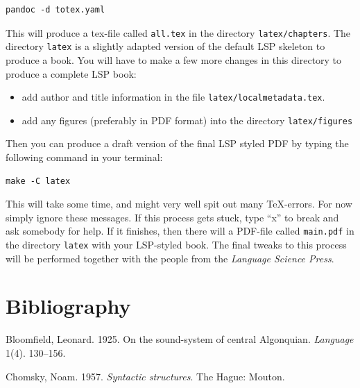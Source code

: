 \begin{verbatim}
pandoc -d totex.yaml
\end{verbatim}

This\paragraphnumber{[3.10]} will produce a tex-file called
\texttt{all.tex} in the directory \texttt{latex/chapters}. The directory
\texttt{latex} is a slightly adapted version of the default LSP skeleton
to produce a book. You will have to make a few more changes in this
directory to produce a complete LSP book:

\begin{itemize}
\tightlist
\item
  add author and title information in the file
  \texttt{latex/localmetadata.tex}.
\item
  add any figures (preferably in PDF format) into the directory
  \texttt{latex/figures}
\end{itemize}

Then\paragraphnumber{[3.11]} you can produce a draft version of the
final LSP styled PDF by typing the following command in your terminal:

\begin{verbatim}
make -C latex
\end{verbatim}

This\paragraphnumber{[3.12]} will take some time, and might very well
spit out many TeX-errors. For now simply ignore these messages. If this
process gets stuck, type ``x'' to break and ask somebody for help. If it
finishes, then there will a PDF-file called \texttt{main.pdf} in the
directory \texttt{latex} with your LSP-styled book. The final tweaks to
this process will be performed together with the people from the
\emph{Language Science Press}.

\hypertarget{bibliography}{%
\chapter*{Bibliography}\label{bibliography}}


\hypertarget{refs}{}
\begin{CSLReferences}{1}{0}
\leavevmode{}%
Bloomfield, Leonard. 1925. On the sound-system of central {Algonquian}.
\emph{Language} 1(4). 130--156.

\leavevmode{}%
Chomsky, Noam. 1957. \emph{Syntactic structures}. The Hague: Mouton.

\end{CSLReferences}
